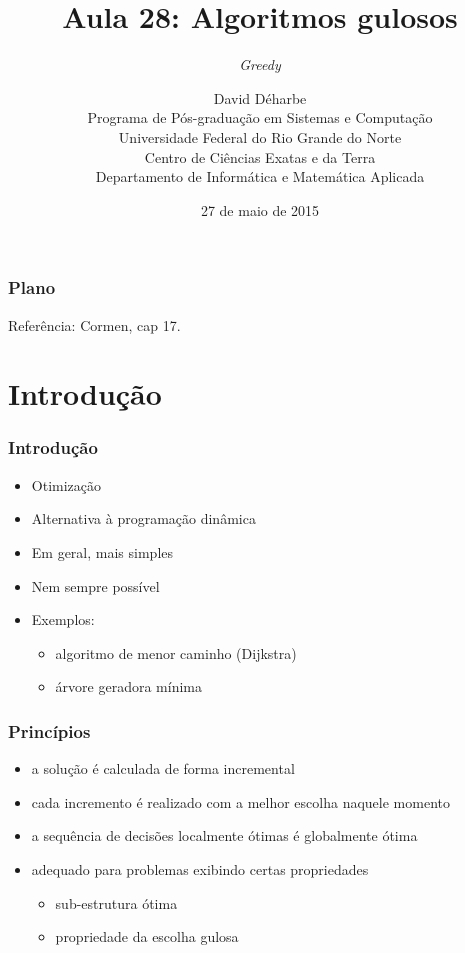 \documentclass{beamer}
\title{Aula 28: Algoritmos gulosos}
\subtitle{\textit{Greedy}}
\author{David Déharbe \\
  Programa de Pós-graduação em Sistemas e Computação \\
  Universidade Federal do Rio Grande do Norte \\
  Centro de Ciências Exatas e da Terra \\
  Departamento de Informática e Matemática Aplicada}
\date{27 de maio de 2015}
\begin{document}


\begin{frame}
  \titlepage
\end{frame}

\begin{frame}
  \frametitle{Plano}

  \tableofcontents
Referência: Cormen, cap 17.
\end{frame}

\section{Introdução}


\begin{frame}
\frametitle{Introdução}

\begin{itemize}

\item Otimização

\item Alternativa à programação dinâmica

\item Em geral, mais simples

\item Nem sempre possível

\item Exemplos:

\begin{itemize}

\item algoritmo de menor caminho (Dijkstra)

\item árvore geradora mínima

\end{itemize}

\end{itemize}

\end{frame}


\begin{frame}
\frametitle{Princípios}

\begin{itemize}
\item a solução é calculada de forma incremental
\item cada incremento é realizado com a melhor escolha naquele momento
\item a sequência de decisões localmente ótimas é globalmente ótima
\item adequado para problemas exibindo certas propriedades
\begin{itemize}
\item sub-estrutura ótima
\item propriedade da escolha gulosa
\end{itemize}

\end{itemize}

\end{frame}
\end{document}
